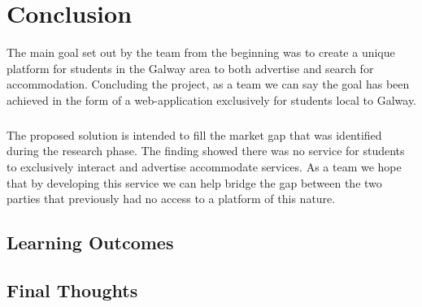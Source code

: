 \chapter{Conclusion}
The main goal set out by the team from the beginning was to create a unique platform for students in the Galway area to both advertise and search for accommodation. Concluding the project, as a team we can say the goal has been achieved in the form of a web-application exclusively for students local to Galway. 

\paragraph{}
The proposed solution is intended to fill the market gap that was identified during the research phase. The finding showed there was no service for students to exclusively interact and advertise accommodate services. As a team we hope that by developing this service we can help bridge the gap between the two parties that previously had no access to a platform of this nature.


\section{Learning Outcomes}

\section{Final Thoughts}